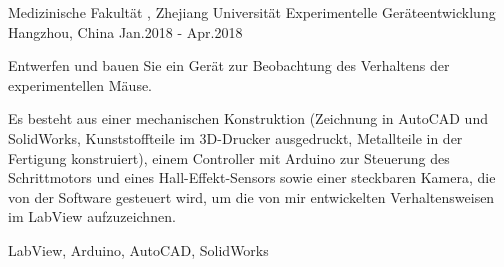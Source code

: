 

\begin{cventries}

  \cventry
    {Medizinische Fakultät , Zhejiang Universität} %
    {Experimentelle Geräteentwicklung}
    {Hangzhou, China} %
    {Jan.2018 - Apr.2018} %
    {
      \begin{cvitems} %
        \item {Entwerfen und bauen Sie ein Gerät zur Beobachtung des Verhaltens der experimentellen Mäuse.}
        \item {Es besteht aus einer mechanischen Konstruktion (Zeichnung in AutoCAD und SolidWorks, Kunststoffteile im 3D-Drucker ausgedruckt, Metallteile in der Fertigung konstruiert), einem Controller mit Arduino zur Steuerung des Schrittmotors und eines Hall-Effekt-Sensors sowie einer steckbaren Kamera, die von der Software gesteuert wird, um die von mir entwickelten Verhaltensweisen im LabView aufzuzeichnen.}
      \end{cvitems}
    }{LabView, Arduino, AutoCAD, SolidWorks}

\end{cventries}
